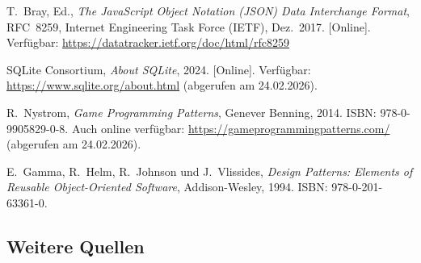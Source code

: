 \documentclass[12pt,a4paper]{article}
\begin{document}
\begin{description}[leftmargin=2em]
    \item[{[3]}] T.~Bray, Ed., \textit{The JavaScript Object Notation (JSON) Data Interchange Format}, RFC~8259, Internet Engineering Task Force (IETF), Dez.~2017. [Online]. Verfügbar: \url{https://datatracker.ietf.org/doc/html/rfc8259}

    \item[{[6]}] SQLite Consortium, \textit{About SQLite}, 2024. [Online]. Verfügbar: \url{https://www.sqlite.org/about.html} (abgerufen am 24.02.2026).

    \item[{[12]}] R.~Nystrom, \textit{Game Programming Patterns}, Genever Benning, 2014. ISBN: 978-0-9905829-0-8. Auch online verfügbar: \url{https://gameprogrammingpatterns.com/} (abgerufen am 24.02.2026).

    \item[{[13]}] E.~Gamma, R.~Helm, R.~Johnson und J.~Vlissides, \textit{Design Patterns: Elements of Reusable Object-Oriented Software}, Addison-Wesley, 1994. ISBN: 978-0-201-63361-0.
\end{description}

\subsection*{Weitere Quellen}
\end{document}
